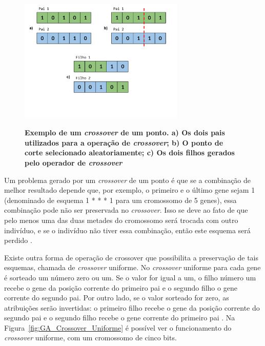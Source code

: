 \documentclass[12pt,oneside,a4paper,english,french,spanish,brazil,]{abntex2}
\begin{document}
\begin{figure}[ht]
\centering
\caption{\textbf{Exemplo de um \textit{crossover} de um ponto. a) Os dois pais utilizados para a operação de \textit{crossover}; b) O ponto de corte selecionado aleatoriamente; c) Os dois filhos gerados pelo operador de \textit{crossover}}}
\includegraphics[width=0.7\textwidth]{imagens/GA_Crossover_de_um_ponto.pdf}
\label{fig:GA_Crossover_de_um_ponto}
\end{figure}

Um problema gerado por um \textit{crossover} de um ponto é que se a combinação de melhor resultado depende que, por exemplo, o primeiro e o último gene sejam 1 (denominado de esquema 1 * * * 1 para um cromossomo de 5 genes), essa combinação pode não ser preservada no \textit{crossover}. Isso se deve ao fato de que pelo menos uma das duas metades do cromossomo será trocada com outro indivíduo, e se o indivíduo não tiver essa combinação, então este esquema será perdido \cite{linden:2008}.

Existe outra forma de operação de crossover que possibilita a preservação de tais esquemas, chamada de \textit{crossover} uniforme. No \textit{crossover} uniforme para cada gene é sorteado um número zero ou um. Se o valor for igual a um, o filho número um recebe o gene da posição corrente do primeiro pai e o segundo filho o gene corrente do segundo pai. Por outro lado, se o valor sorteado for zero, as atribuições serão invertidas: o primeiro filho recebe o gene da posição corrente do segundo pai e o segundo filho recebe o gene corrente do primeiro pai \cite{linden:2008}. Na Figura~\ref{fig:GA_Crossover_Uniforme} é possível ver o funcionamento do \textit{crossover} uniforme, com um cromossomo de cinco bits.
\end{document}
